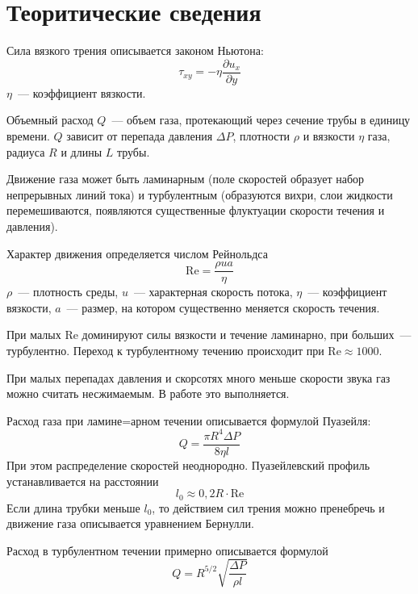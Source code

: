 \section{Теоритические сведения}
Сила вязкого трения описывается законом Ньютона:
\[\tau_{xy}=-\eta\frac{\partial u_x}{\partial y}\]
$\eta$~--- коэффициент вязкости.

Объемный расход $Q$~--- объем газа, протекающий через сечение трубы в единицу времени.
$Q$ зависит от перепада давления $\Delta P$, плотности $\rho$ и вязкости $\eta$ газа,
радиуса $R$ и длины $L$ трубы.

Движение газа может быть ламинарным (поле скоростей образует набор непрерывных линий тока)
и турбулентным (образуются вихри, слои жидкости перемешиваются, появляются существенные
флуктуации скорости течения и давления).

Характер движения определяется числом Рейнольдса
\[\mathrm{Re}=\frac{\rho u a}{\eta}\]
$\rho$~--- плотность среды, $u$~--- характерная скорость потока,
$\eta$~--- коэффициент вязкости, $a$~--- размер, на котором существенно меняется скорость течения.

При малых Re доминируют силы вязкости и течение ламинарно, при больших~--- турбулентно.
Переход к турбулентному течению происходит при $\mathrm{Re}\approx 1000$. 

При малых перепадах давления и скорсотях много меньше скорости звука
газ можно считать несжимаемым. В работе это выполняется.

Расход газа при ламине=арном течении описывается формулой Пуазейля:
\[Q=\frac{\pi R^4 \Delta P}{8\eta l}\]
При этом распределение скоростей неоднородно. Пуазейлевский профиль
устанавливается на расстоянии
\[l_0\approx 0{,}2R\cdot\mathrm{Re}\]
Если длина трубки меньше $l_0$, то действием сил трения можно пренебречь
и движение газа описывается уравнением Бернулли.

Расход в турбулентном течении примерно описывается формулой
\[Q=R^{5/2}\sqrt{\frac{\Delta P}{\rho l}}\]
